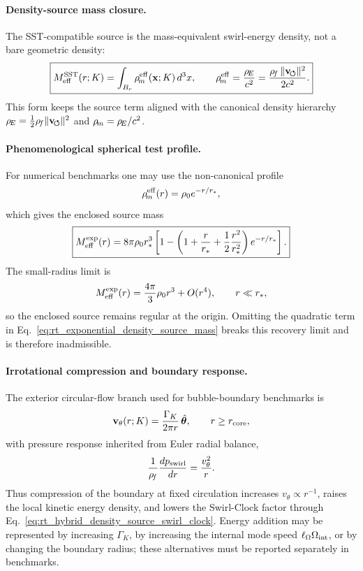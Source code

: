 \paragraph{Density-source mass closure.}
The SST-compatible source is the mass-equivalent swirl-energy density, not a bare
geometric density:
\begin{equation}
\boxed{
M_{\rm eff}^{\rm SST}(r;K)
=
\int_{B_r}\rho_{\!m}^{\rm eff}(\mathbf{x};K)\,d^3x,
\qquad
\rho_{\!m}^{\rm eff}
=
\frac{\rho_{\!E}}{c^2}
=
\frac{\rho_{\!f}\,\|\mathbf{v}_{\!\boldsymbol{\circlearrowleft}}\|^2}{2c^2}.
}
\label{eq:rt_density_source_mass_closure}
\end{equation}
This form keeps the source term aligned with the canonical density hierarchy
$\rho_{\!E}=\tfrac12\rho_{\!f}\|\mathbf{v}_{\!\boldsymbol{\circlearrowleft}}\|^2$ and $\rho_{\!m}=\rho_{\!E}/c^2$.

\paragraph{Phenomenological spherical test profile.}
For numerical benchmarks one may use the non-canonical profile
\begin{equation}
\rho_{\!m}^{\rm eff}(r)=\rho_0 e^{-r/r_*},
\end{equation}
which gives the enclosed source mass
\begin{equation}
\boxed{
M_{\rm eff}^{\rm exp}(r)
=
8\pi\rho_0 r_*^3
\left[
1-
\left(
1+\frac{r}{r_*}
+\frac{1}{2}\frac{r^2}{r_*^2}
\right)e^{-r/r_*}
\right].
}
\label{eq:rt_exponential_density_source_mass}
\end{equation}
The small-radius limit is
\begin{equation}
M_{\rm eff}^{\rm exp}(r)
=
\frac{4\pi}{3}\rho_0 r^3+O(r^4),
\qquad r\ll r_*,
\end{equation}
so the enclosed source remains regular at the origin.  Omitting the quadratic
term in Eq.~\eqref{eq:rt_exponential_density_source_mass} breaks this recovery
limit and is therefore inadmissible.

\paragraph{Irrotational compression and boundary response.}
The exterior circular-flow branch used for bubble-boundary benchmarks is
\begin{equation}
\mathbf{v}_{\theta}(r;K)
=\frac{\Gamma_K}{2\pi r}\,\hat{\boldsymbol{\theta}},
\qquad r\ge r_{\rm core},
\label{eq:rt_irrotational_boundary_velocity}
\end{equation}
with pressure response inherited from Euler radial balance,
\begin{equation}
\frac{1}{\rho_{\!f}}\frac{dp_{\rm swirl}}{dr}
=\frac{v_{\theta}^{2}}{r}.
\label{eq:rt_boundary_pressure_balance}
\end{equation}
Thus compression of the boundary at fixed circulation increases
$v_{\theta}\propto r^{-1}$, raises the local kinetic energy density, and lowers
the Swirl-Clock factor through Eq.~\eqref{eq:rt_hybrid_density_source_swirl_clock}.
Energy addition may be represented by increasing $\Gamma_K$, by increasing the
internal mode speed $\ell_{\Omega}\Omega_{\rm int}$, or by changing the boundary
radius; these alternatives must be reported separately in benchmarks.

